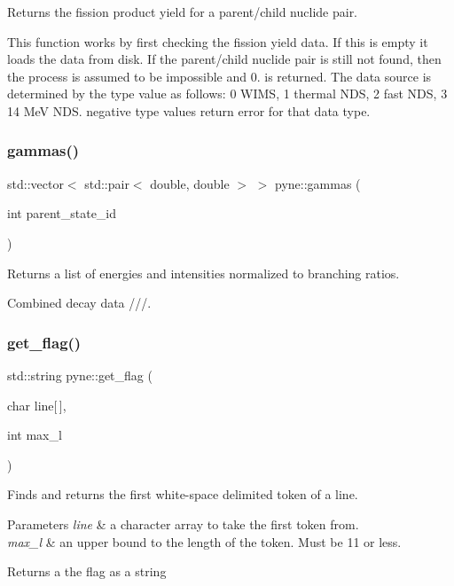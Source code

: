 Returns the fission product yield for a parent/child nuclide pair. 

This function works by first checking the fission yield data. If this is empty it loads the data from disk. If the parent/child nuclide pair is still not found, then the process is assumed to be impossible and 0. is returned. The data source is determined by the type value as follows\+: 0 W\+I\+MS, 1 thermal N\+DS, 2 fast N\+DS, 3 14 MeV N\+DS. negative type values return error for that data type. \mbox{\label{namespacepyne_a8eeb397c67e950ae3b78c02a6a09655b}} 
\subsubsection{\texorpdfstring{gammas()}{gammas()}}
{\footnotesize\ttfamily std\+::vector$<$ std\+::pair$<$ double, double $>$ $>$ pyne\+::gammas (\begin{DoxyParamCaption}\item[{int}]{parent\+\_\+state\+\_\+id }\end{DoxyParamCaption})}



Returns a list of energies and intensities normalized to branching ratios. 

Combined decay data ///. \mbox{\label{namespacepyne_ab883f7c602f63e87fae5c2f48cfed0f8}} 
\subsubsection{\texorpdfstring{get\+\_\+flag()}{get\_flag()}}
{\footnotesize\ttfamily std\+::string pyne\+::get\+\_\+flag (\begin{DoxyParamCaption}\item[{char}]{line\mbox{[}$\,$\mbox{]},  }\item[{int}]{max\+\_\+l }\end{DoxyParamCaption})}

Finds and returns the first white-\/space delimited token of a line. 
\begin{DoxyParams}{Parameters}
{\em line} & a character array to take the first token from. \\
\hline
{\em max\+\_\+l} & an upper bound to the length of the token. Must be 11 or less. \\
\hline
\end{DoxyParams}
\begin{DoxyReturn}{Returns}
a the flag as a string 
\end{DoxyReturn}
\mbox{\label{namespacepyne_a98f776164d1812878cb4b4ee4ef943f5}} 
